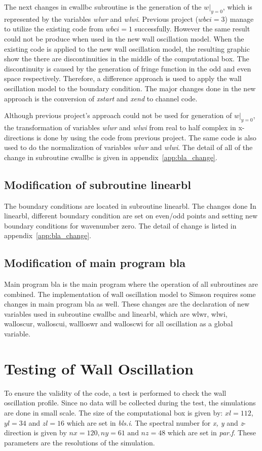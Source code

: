 The next changes in cwallbc subroutine is the generation of the $w|_{y=0}$, which is represented by the variables \emph{wlwr} and \emph{wlwi}. Previous project ($wbci = 3$) manage to utilize the existing code from $wbci = 1$ successfully. However the same result could not be produce when used in the new wall oscillation model. When the existing code is applied to the new wall oscillation model, the resulting graphic show the there are discontinuities in the middle of the computational box. The discontinuity is caused by the generation of fringe function in the odd and even space respectively. Therefore, a difference approach is used to apply the wall oscillation model to the boundary condition. The major changes done in the new approach is the conversion of \emph{xstart} and \emph{xend} to channel code. 

Although previous project's approach could not be used for generation of $w|_{y=0}$, the transformation of variables \emph{wlwr} and \emph{wlwi} from real to half complex in x-directions is done by using the code from previous project. The same code is also used to do the normalization of variables \emph{wlwr} and \emph{wlwi}. The detail of all of the change in subroutine cwallbc is given in appendix~\ref{app:bla_change}.

\subsection{Modification of subroutine linearbl}
The boundary conditions are located in subroutine linearbl. The changes done In linearbl, different boundary condition are set on even/odd points and setting new boundary conditions for wavenumber zero. The detail of change is listed in appendix~\ref{app:bla_change}.

\subsection{Modification of main program bla} 
Main program bla is the main program where the operation of all subroutines are combined. The implementation of wall oscillation model to Simson requires some changes in main program bla as well. These changes are the declaration of new variables used in subroutine cwallbc and linearbl, which are wlwr, wlwi, walloscur, walloscui, wallloswr and walloscwi for all oscillation as a global variable. 

\section{Testing of Wall Oscillation}
To ensure the validity of the code, a test is performed to check the wall oscillation profile. Since no data will be collected during the test, the simulations are done in small scale. The size of the computational box is given by: $xl=112$, $yl=34$ and $zl=16$ which are set in \emph{bls.i}. The spectral number for \emph{x, y} and \emph{z}-direction is given by $nx =120, ny=61 \mbox{ and } nz=48$ which are set in \emph{par.f}. These parameters are the resolutions of the simulation.

